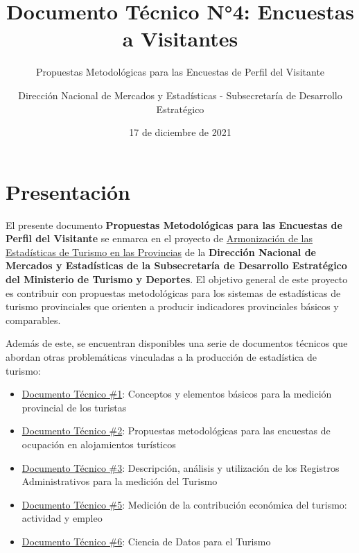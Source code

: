 \documentclass[
]{book}
\title{Documento Técnico N°4: Encuestas a Visitantes}
\subtitle{Propuestas Metodológicas para las Encuestas de Perfil del Visitante}
\author{Dirección Nacional de Mercados y Estadísticas - Subsecretaría de Desarrollo Estratégico}
\date{17 de diciembre de 2021}
\let\oldmaketitle\maketitle
\begin{document}
\maketitle


\newpage

\let\maketitle\oldmaketitle
\maketitle

{
\setcounter{tocdepth}{1}
\tableofcontents
}
\hypertarget{presentaciuxf3n}{%
\chapter*{\texorpdfstring{\textbf{Presentación}}{Presentación}}\label{presentaciuxf3n}}

El presente documento \textbf{Propuestas Metodológicas para las Encuestas de Perfil del Visitante} se enmarca en el proyecto de \href{https://armonizacion.yvera.tur.ar//}{Armonización de las Estadísticas de Turismo en las Provincias} de la \textbf{Dirección Nacional de Mercados y Estadísticas de la Subsecretaría de Desarrollo Estratégico del Ministerio de Turismo y Deportes}. El objetivo general de este proyecto es contribuir con propuestas metodológicas para los sistemas de estadísticas de turismo provinciales que orienten a producir indicadores provinciales básicos y comparables.

Además de este, se encuentran disponibles una serie de documentos técnicos que abordan otras problemáticas vinculadas a la producción de estadística de turismo:

\begin{itemize}
\item
  \href{https://dnme-minturdep.github.io/DT1_medicion_turismo/}{Documento Técnico \#1}: Conceptos y elementos básicos para la medición provincial de los turistas
\item
  \href{https://dnme-minturdep.github.io/DT2_encuestas/}{Documento Técnico \#2}: Propuestas metodológicas para las encuestas de ocupación en alojamientos turísticos
\item
  \href{https://dnme-minturdep.github.io/DT3_registros_adminsitrativos/}{Documento Técnico \#3}: Descripción, análisis y utilización de los Registros Administrativos para la medición del Turismo
\item
  \href{https://dnme-minturdep.github.io/DT5_actividad_empleo/}{Documento Técnico \#5}: Medición de la contribución económica del turismo: actividad y empleo
\item
  \href{https://dnme-minturdep.github.io/DT6_ciencia_de_datos_turismo/}{Documento Técnico \#6}: Ciencia de Datos para el Turismo
\end{itemize}
\end{document}
